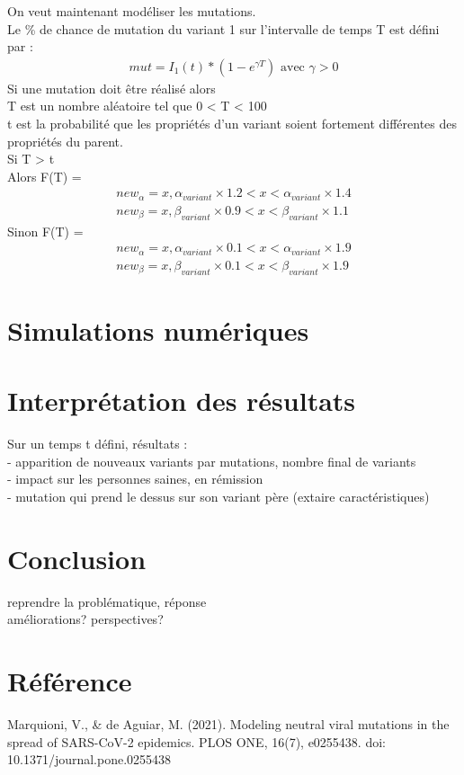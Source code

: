 \documentclass{article}
\begin{document}
\noindent
On veut maintenant modéliser les mutations.\\
Le \% de chance de mutation du variant 1 sur l'intervalle de temps T est défini par :
\begin{align}
    mut = I_1(t)*(1-e^{\gamma T})\text{ avec }\gamma > \text{0}
\end{align}
\noindent
Si une mutation doit être réalisé alors \\
\noindent
T est un nombre aléatoire tel que 0 < T < 100 \\
t est la probabilité que les propriétés d'un variant soient fortement différentes des propriétés du parent.\\
Si T > t \\
Alors F(T) = 
\begin{align}
    new_\alpha = x, \alpha_{variant} \times 1.2 < x < \alpha_{variant} \times 1.4 \\
    new_\beta = x, \beta_{variant} \times 0.9 < x < \beta_{variant} \times 1.1
\end{align}
\noindent
Sinon F(T) = \\
\begin{align}
    new_\alpha= x, \alpha_{variant} \times 0.1 < x < \alpha_{variant} \times 1.9 \\
    new_\beta= x, \beta_{variant} \times 0.1 < x < \beta_{variant} \times 1.9
\end{align}


\section{Simulations numériques}


\section{Interprétation des résultats}

Sur un temps t défini, résultats :\\
- apparition de nouveaux variants par mutations, nombre final de variants\\
- impact sur les personnes saines, en rémission\\
- mutation qui prend le dessus sur son variant père (extaire caractéristiques)\\

\section{Conclusion}

reprendre la problématique, réponse\\
améliorations? perspectives?\\

\section{Référence}

Marquioni, V., & de Aguiar, M. (2021). Modeling neutral viral mutations in the spread of SARS-CoV-2 epidemics. PLOS ONE, 16(7), e0255438. doi: 10.1371/journal.pone.0255438
\end{document}
